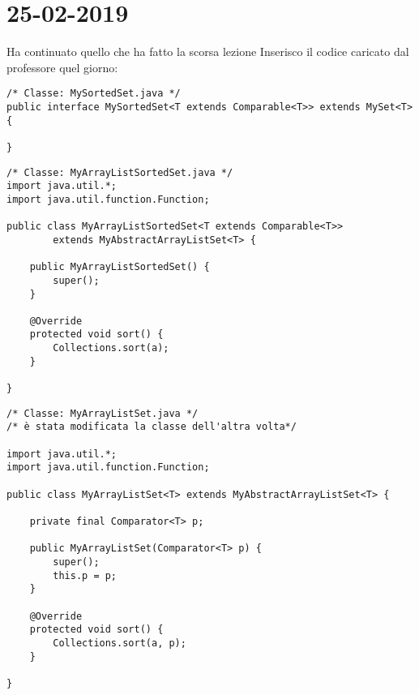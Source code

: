 

\newpage
\section{25-02-2019}
\noindent Ha continuato quello che ha fatto la scorsa lezione \newline
Inserisco il codice caricato dal professore quel giorno: 

\begin{lstlisting}[basicstyle=\small,]
/* Classe: MySortedSet.java */
public interface MySortedSet<T extends Comparable<T>> extends MySet<T> {

}
\end{lstlisting}

\begin{lstlisting}[basicstyle=\small,]
/* Classe: MyArrayListSortedSet.java */
import java.util.*;
import java.util.function.Function;

public class MyArrayListSortedSet<T extends Comparable<T>>
        extends MyAbstractArrayListSet<T> {

    public MyArrayListSortedSet() {
        super();
    }

    @Override
    protected void sort() {
        Collections.sort(a);
    }

}
\end{lstlisting}

\begin{lstlisting}[basicstyle=\small,]
/* Classe: MyArrayListSet.java */
/* è stata modificata la classe dell'altra volta*/

import java.util.*;
import java.util.function.Function;

public class MyArrayListSet<T> extends MyAbstractArrayListSet<T> {

    private final Comparator<T> p;

    public MyArrayListSet(Comparator<T> p) {
        super();
        this.p = p;
    }

    @Override
    protected void sort() {
        Collections.sort(a, p);
    }

}

\end{lstlisting}

